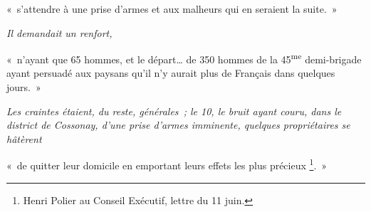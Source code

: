 \documentclass[french,twoside]{book} %
\newenvironment{quoteblock}%
  {\begin{quoting}}
  {\end{quoting}}
\newenvironment{quotebar}{%
    \def\FrameCommand{{\color{rubric!10!}\vrule width 0.5em} \hspace{0.9em}}%
    \def\OuterFrameSep{\itemsep} %
    \MakeFramed {\advance\hsize-\width \FrameRestore}
  }%
  {%
    \endMakeFramed
  }
\renewenvironment{quoteblock}%
  {%
    \savenotes
    \setstretch{0.9}
    \normalfont
    \begin{quotebar}
  }
  {%
    \end{quotebar}
    \spewnotes
  }
\begin{document}
\begin{quoteblock}
 \noindent « s’attendre à une prise d’armes et aux malheurs qui en seraient la suite. »\par
 \emph{Il demandait un renfort,}\par
 « n’ayant que 65 hommes, et le départ… de 350 hommes de la 45\textsuperscript{me} demi-brigade ayant persuadé aux paysans qu’il n’y aurait plus de Français dans quelques jours. »\par
 \emph{Les craintes étaient, du reste, générales ; le 10, le bruit ayant couru, dans le district de Cossonay, d’une prise d’armes imminente, quelques propriétaires se hâtèrent}\par
 « de quitter leur domicile en emportant leurs effets les plus précieux \footnote{Henri Polier au Conseil Exécutif, lettre du 11 juin.}. »
 \end{quoteblock}
\end{document}
